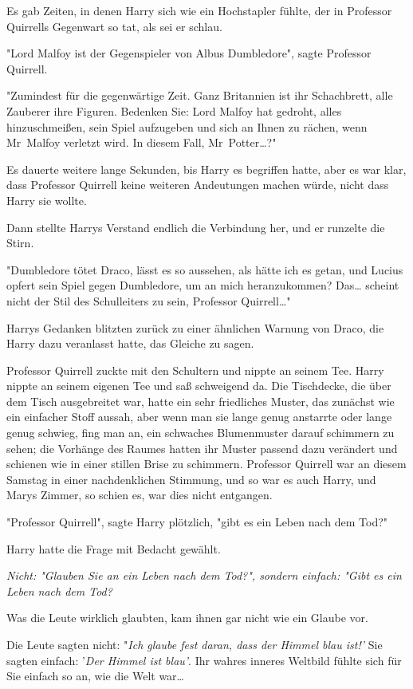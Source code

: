 {Es gab Zeiten, in denen Harry sich wie ein Hochstapler fühlte, der in Professor Quirrells Gegenwart so tat, als sei er schlau.

"Lord Malfoy ist der Gegenspieler von Albus Dumbledore", sagte Professor Quirrell.

"Zumindest für die gegenwärtige Zeit. Ganz Britannien ist ihr Schachbrett, alle Zauberer ihre Figuren. Bedenken Sie: Lord Malfoy hat gedroht, alles hinzuschmeißen, sein Spiel aufzugeben und sich an Ihnen zu rächen, wenn Mr~Malfoy verletzt wird. In diesem Fall, Mr~Potter…?"

Es dauerte weitere lange Sekunden, bis Harry es begriffen hatte, aber es war klar, dass Professor Quirrell keine weiteren Andeutungen machen würde, nicht dass Harry sie wollte.

Dann stellte Harrys Verstand endlich die Verbindung her, und er runzelte die Stirn.

"Dumbledore tötet Draco, lässt es so aussehen, als hätte ich es getan, und Lucius opfert sein Spiel gegen Dumbledore, um an mich heranzukommen? Das… scheint nicht der Stil des Schulleiters zu sein, Professor Quirrell…"

Harrys Gedanken blitzten zurück zu einer ähnlichen Warnung von Draco, die Harry dazu veranlasst hatte, das Gleiche zu sagen.

Professor Quirrell zuckte mit den Schultern und nippte an seinem Tee. Harry nippte an seinem eigenen Tee und saß schweigend da. Die Tischdecke, die über dem Tisch ausgebreitet war, hatte ein sehr friedliches Muster, das zunächst wie ein einfacher Stoff aussah, aber wenn man sie lange genug anstarrte oder lange genug schwieg, fing man an, ein schwaches Blumenmuster darauf schimmern zu sehen; die Vorhänge des Raumes hatten ihr Muster passend dazu verändert und schienen wie in einer stillen Brise zu schimmern. Professor Quirrell war an diesem Samstag in einer nachdenklichen Stimmung, und so war es auch Harry, und Marys Zimmer, so schien es, war dies nicht entgangen.

"Professor Quirrell", sagte Harry plötzlich, "gibt es ein Leben nach dem Tod?"

Harry hatte die Frage mit Bedacht gewählt.

\emph{Nicht: "Glauben Sie an ein Leben nach dem Tod?", sondern einfach: "Gibt es ein Leben nach dem Tod?}

Was die Leute wirklich glaubten, kam ihnen gar nicht wie ein Glaube vor.

Die Leute sagten nicht: "\emph{Ich glaube fest daran, dass der Himmel blau ist!'} Sie sagten einfach: '\emph{Der Himmel ist blau'}. Ihr wahres inneres Weltbild fühlte sich für Sie einfach so an, wie die Welt war…

}
